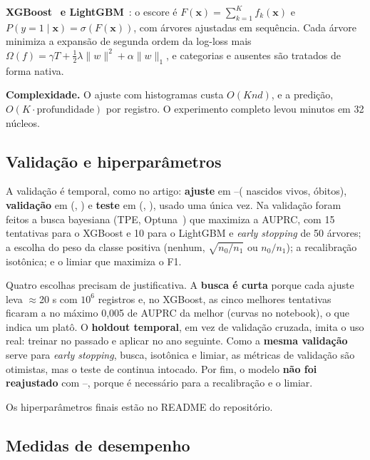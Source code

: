 \documentclass[12pt]{article}
\begin{document}
\textbf{XGBoost}~\cite{chen2016} \textbf{e LightGBM}~\cite{ke2017}: o escore é $F(\mathbf{x}) = \sum_{k=1}^{K} f_k(\mathbf{x})$ e $P(y{=}1\mid\mathbf{x}) = \sigma(F(\mathbf{x}))$, com árvores ajustadas em sequência. Cada árvore minimiza a expansão de segunda ordem da log-loss mais $\Omega(f) = \gamma T + \tfrac{1}{2}\lambda\lVert w\rVert^2 + \alpha\lVert w\rVert_1$, e categorias e ausentes são tratados de forma nativa.

\textbf{Complexidade.} O ajuste com histogramas custa $O(K n d)$, e a predição, $O(K\cdot\text{profundidade})$ por registro. O experimento completo levou \tempoMin{} minutos em 32 núcleos.

\subsection{Validação e hiperparâmetros}

A validação é temporal, como no artigo: \textbf{ajuste} em \anoIni--\anoAjFim (\nAjuste{} nascidos vivos, \obAjuste{} óbitos), \textbf{validação} em \anoValid{} (\nValid{}, \obValid{}) e \textbf{teste} em \anoTeste{} (\nTeste{}, \obTeste{}), usado uma única vez. Na validação foram feitos a busca bayesiana (TPE, Optuna~\cite{akiba2019}) que maximiza a AUPRC, com 15 tentativas para o XGBoost e 10 para o LightGBM e \textit{early stopping} de 50 árvores; a escolha do peso da classe positiva (nenhum, $\sqrt{n_0/n_1}$ ou $n_0/n_1$); a recalibração isotônica; e o limiar que maximiza o F1.

Quatro escolhas precisam de justificativa. A \textbf{busca é curta} porque cada ajuste leva $\approx$20 s com $10^6$ registros e, no XGBoost, as cinco melhores tentativas ficaram a no máximo 0,005 de AUPRC da melhor (curvas no notebook), o que indica um platô. O \textbf{holdout temporal}, em vez de validação cruzada, imita o uso real: treinar no passado e aplicar no ano seguinte. Como a \textbf{mesma validação} serve para \textit{early stopping}, busca, isotônica e limiar, as métricas de validação são otimistas, mas o teste de \anoTeste{} continua intocado. Por fim, o modelo \textbf{não foi reajustado} com \anoIni--\anoValid, porque \anoValid{} é necessário para a recalibração e o limiar.

Os hiperparâmetros finais estão no README do repositório.

\subsection{Medidas de desempenho}
\end{document}
